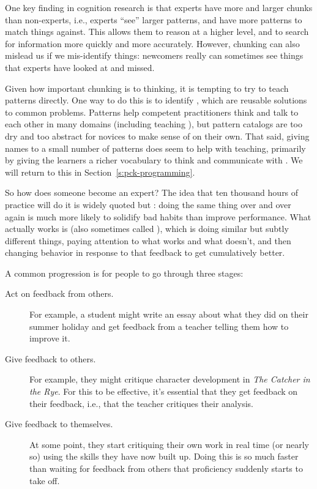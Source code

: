 One key finding in cognition research is that experts have more and
larger chunks than non-experts, i.e., experts ``see'' larger patterns, and
have more patterns to match things against. This allows them to reason
at a higher level, and to search for information more quickly and more
accurately. However, chunking can also mislead us if we mis-identify
things: newcomers really can sometimes see things that experts have
looked at and missed.

Given how important chunking is to thinking, it is tempting to try to
teach patterns directly. One way to do this is to identify , which are reusable solutions to common
problems. Patterns help competent practitioners think and talk to each
other in many domains (including teaching \cite{Berg2012}), but
pattern catalogs are too dry and too abstract for novices to make
sense of on their own. That said, giving names to a small number of
patterns does seem to help with teaching, primarily by giving the
learners a richer vocabulary to think and communicate with
\cite{Kuit2004,Byck2005,Saja2006}. We will
return to this in Section~\ref{s:pck-programming}.


So how does someone become an expert? The idea that ten thousand hours
of practice will do it is widely quoted but : doing the same thing over and over again is
much more likely to solidify bad habits than improve performance. What
actually works is  (also
sometimes called ), which
is doing similar but subtly different things, paying attention to what
works and what doesn't, and then changing behavior in response to that
feedback to get cumulatively better.

A common progression is for people to go through three stages:

\begin{description}
\item[Act on feedback from others.]
For example, a student might write an essay about what they did on
their summer holiday and get feedback from a teacher telling them
how to improve it.
\item[Give feedback to others.]
For example, they might critique character development in \emph{The
Catcher in the Rye}. For this to be effective, it's essential that
they get feedback on their feedback, i.e., that the teacher critiques
their analysis.
\item[Give feedback to themselves.]
At some point, they start critiquing their own work in real time (or
nearly so) using the skills they have now built up. Doing this is so
much faster than waiting for feedback from others that proficiency
suddenly starts to take off.
\end{description}


